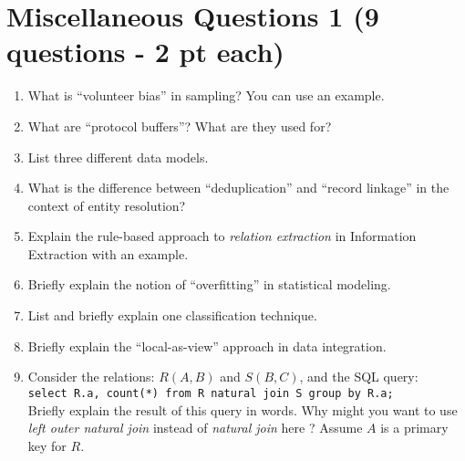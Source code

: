 \documentclass[11pt]{article}
\newcommand{\answer}[2]{\noindent {\bf Answer:} #2}
\renewcommand{\answer}[2]{\vspace{#1}}
\begin{document}
\section*{Miscellaneous Questions 1 (9 questions - 2 pt each)}
\begin{enumerate}

\item What is ``volunteer bias'' in sampling? You can use an example.

\answer{1.9in}{See class notes.}

\item What are ``protocol buffers''? What are they used for?

\answer{1.9in}{See class notes.}

\item List three different data models.

\answer{1.7in}{See class notes.}

\item What is the difference between ``deduplication'' and ``record linkage'' in the context of entity resolution?

\answer{2.9in}{See class notes.}

\item Explain the rule-based approach to {\em relation extraction} in Information Extraction with an
example.

\answer{2.9in}{See class notes.}

\item Briefly explain the notion of ``overfitting'' in statistical modeling.

\answer{2.9in}{See class notes.}

\item List and briefly explain one classification technique.

\answer{2.5in}{See class notes.}

\item Briefly explain the ``local-as-view'' approach in data integration.

\answer{2.7in}{See class notes.}


\item Consider the relations: $R(A, B)$ and $S(B, C)$, and the SQL query: \\[3pt] {\tt select R.a, count(*) from R natural join S group by R.a;} \\[2pt]
Briefly explain the result of this query in words. Why might you want to use {\em left outer natural join} instead of {\em natural join} here ? 
Assume $A$ is a primary key for $R$.

\answer{2.9in}{The query returns for each tuple in $R$, the number of matching tuples in $S$. The result will not contain any tuples $t = (a, b)$ in $R$ that do not have a match in $S$, and we might want to use outerjoin to produce the result $(a, b, 0)$ for those tuples.}




\end{enumerate}
\end{document}

